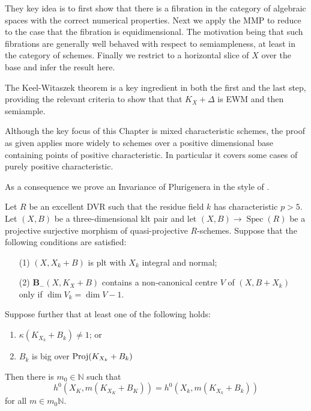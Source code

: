 \documentclass[a4paper,12pt]{book}
\DeclareMathOperator{\Spec}{Spec}
\begin{document}
	They key idea is to first show that there is a fibration in the category of algebraic spaces with the correct numerical properties. Next we apply the MMP to reduce to the case that the fibration is equidimensional. The motivation being that such fibrations are generally well behaved with respect to semiampleness, at least in the category of schemes. Finally we restrict to a horizontal slice of $X$ over the base and infer the result here.
	
	The Keel-Witaszek theorem is a key ingredient in both the first and the last step, providing the relevant criteria to show that that $K_{X}+\Delta$ is EWM and then semiample.
	
	Although the key focus of this Chapter is mixed characteristic schemes, the proof as given applies more widely to schemes over a positive dimensional base containing points of positive characteristic. In particular it covers some cases of purely positive characteristic.
	
	As a consequence we prove an Invariance of Plurigenera in the style of \cite{}. 
	
	\begin{theo}\label{Main_Abund2}
		Let $R$ be an excellent DVR such that the residue field $k$ has characteristic $p>5$.
		Let $(X,B)$ be a three-dimensional klt pair and let $(X,B)\to \Spec(R)$ be a projective surjective morphism of quasi-projective $R$-schemes.  Suppose that the following conditions are satisfied:
		
		\begin{enumerate}
			\item[(1)] $(X,X_{k}+B)$ is plt with $X_k$ integral and normal;
			\item[(2)] ${\mathbf{B}_{-}(X, K_{X}+B)}$ contains a non-canonical centre $V$ of $(X,B+X_{k})$ only if $\dim V_{k}=\dim V -1$.
		\end{enumerate}
		
		Suppose further that at least one of the following holds:
		\begin{enumerate}
			\item $\kappa(K_{X_{k}}+B_{k}) \neq 1$; or
			\item $B_{k}$ is big over $\textup{Proj}(K_{X_{k}}+B_{k})$
		\end{enumerate}	
		Then there is $m_{0} \in \mathbb{N}$ such that 
		$$h^{0}(X_{K},m(K_{X_{K}}+B_{K}))=h^{0}(X_{k},m(K_{X_{k}}+B_{k}))$$
		for all $m \in m_{0}\mathbb{N}$.
		
	\end{theo}
	
\end{document}
